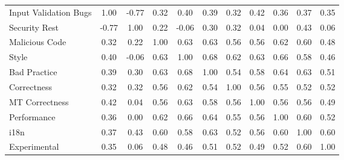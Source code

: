 
\begin{tabular}{lccccccccc}
\hline
Input Validation Bugs & 1.00 & -0.77 & 0.32 & 0.40 & 0.39 & 0.32 & 0.42 & 0.36 & 0.37 & 0.35\\
Security Rest & -0.77 & 1.00 & 0.22 & -0.06 & 0.30 & 0.32 & 0.04 & 0.00 & 0.43 & 0.06\\
Malicious Code & 0.32 & 0.22 & 1.00 & 0.63 & 0.63 & 0.56 & 0.56 & 0.62 & 0.60 & 0.48\\
Style & 0.40 & -0.06 & 0.63 & 1.00 & 0.68 & 0.62 & 0.63 & 0.66 & 0.58 & 0.46\\
Bad Practice & 0.39 & 0.30 & 0.63 & 0.68 & 1.00 & 0.54 & 0.58 & 0.64 & 0.63 & 0.51\\
Correctness & 0.32 & 0.32 & 0.56 & 0.62 & 0.54 & 1.00 & 0.56 & 0.55 & 0.52 & 0.52\\
MT Correctness & 0.42 & 0.04 & 0.56 & 0.63 & 0.58 & 0.56 & 1.00 & 0.56 & 0.56 & 0.49\\
Performance & 0.36 & 0.00 & 0.62 & 0.66 & 0.64 & 0.55 & 0.56 & 1.00 & 0.60 & 0.52\\
i18n & 0.37 & 0.43 & 0.60 & 0.58 & 0.63 & 0.52 & 0.56 & 0.60 & 1.00 & 0.60\\
Experimental & 0.35 & 0.06 & 0.48 & 0.46 & 0.51 & 0.52 & 0.49 & 0.52 & 0.60 & 1.00\\
\hline
\end{tabular}
